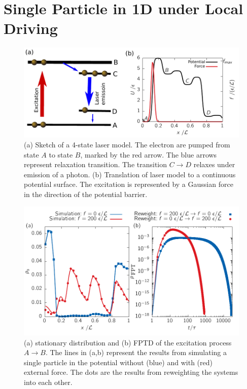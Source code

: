 \section{Single Particle in 1D under Local Driving}
\label{sec:Lasersys}
\begin{figure}[h]
\centering
\includegraphics{../images/laser.pdf}
\caption[Sketch of a 4-state laser model with potential surface and pumping force.]{ (a) Sketch of a 4-state laser model. The electron are pumped from state $A$ to state $B$, marked by the red arrow. The blue arrows represent relaxation transition. The transition $C \rightarrow D$ relaxes under emission of a photon. (b) Translation of laser model to a continuous potential surface. The excitation is represented by a Gaussian force in the direction of the potential barrier.  }
\label{fig:laser}
\end{figure}

\begin{figure}[t]
\centering
 \includegraphics{../plots/Urew/single_9040.pdf}
 \caption[Stationary distribution and first-passage time distribution of the excitation process for the laser model.]{(a) stationary distribution and (b) FPTD of the excitation process $ A \rightarrow B$. The lines in (a,b) represent the results from simulating a single particle in the potential without (blue) and with (red) external force. The dots are the results from reweighting the systems into each other. }
 \label{fig:singleL}
\end{figure}

